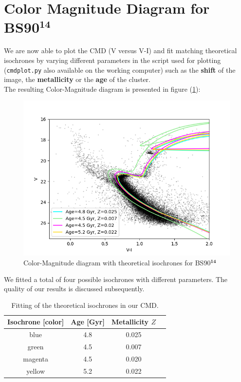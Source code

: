 \section{Color Magnitude Diagram for BS90$^{\mathbf{14}}$ }
We are now able to plot the CMD (V versus V-I) and fit matching theoretical isochrones by varying different parameters in the script used for plotting (\texttt{cmdplot.py} also available on the working computer) such as the \textbf{shift} of the image, the \textbf{metallicity} or the \textbf{age} of the cluster. \\
The resulting Color-Magnitude diagram is presented in figure (\ref{fig:CMD}):
\begin{figure}[H]
	\centering
	\includegraphics[scale=0.6]{figures/Plots/CMD.png}
	\caption{Color-Magnitude diagram with theoretical isochrones for BS90$^{\mathbf{14}}$}\label{fig:CMD}
\end{figure}

We fitted a total of four possible isochrones with different parameters. The quality of our results is discussed subsequently.

\begin{table}[H]
\setlength{\tabcolsep}{5mm}
\setlength\extrarowheight{2mm}
\centering
\begin{tabular}{c| c c c}

Isochrone [color] & Age [Gyr] & Metallicity $Z$ \\ \hline 

blue & 4.8 & 0.025  \\
green & 4.5 & 0.007  \\
magenta & 4.5 & 0.020  \\
yellow & 5.2 & 0.022  \\

\end{tabular}
\caption{Fitting of the theoretical isochrones in our CMD.}
\end{table}


